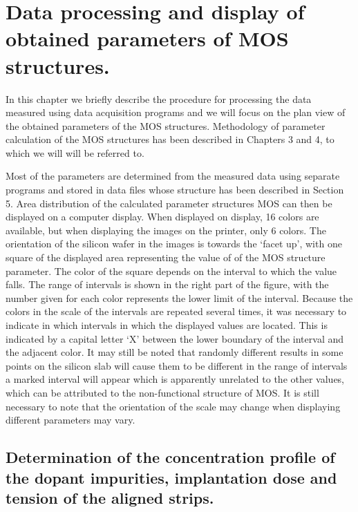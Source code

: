 
\chapter{Data processing and display of obtained parameters of MOS structures.}\label{Chapter6}

In this chapter we briefly describe the procedure for processing the
data measured using data acquisition programs and we will focus on the
plan view of the obtained parameters of the MOS
structures. Methodology of parameter calculation of the MOS structures
has been described in Chapters 3 and 4, to which we will will be
referred to.

Most of the parameters are determined from the measured data using
separate programs and stored in data files whose structure has been
described in Section 5. Area distribution of the calculated parameter
structures MOS can then be displayed on a computer display. When
displayed on display, 16 colors are available, but when displaying
the images on the printer, only 6 colors. The orientation of the
silicon wafer in the images is towards the `facet up', with one square
of the displayed area representing the value of of the MOS structure
parameter. The color of the square depends on the interval to which
the value falls. The range of intervals is shown in the right part of
the figure, with the number given for each color represents the lower
limit of the interval. Because the colors in the scale of the
intervals are repeated several times, it was necessary to indicate in
which intervals in which the displayed values are located. This is
indicated by a capital letter `X' between the lower boundary of the
interval and the adjacent color. It may still be noted that randomly
different results in some points on the silicon slab will cause them
to be different in the range of intervals a marked interval will
appear which is apparently unrelated to the other values, which can be
attributed to the non-functional structure of MOS\@. It is still
necessary to note that the orientation of the scale may change when
displaying different parameters may vary.

\section{Determination of the concentration profile of the dopant impurities, implantation dose and tension of the aligned strips.}\label{sec:6.1}

